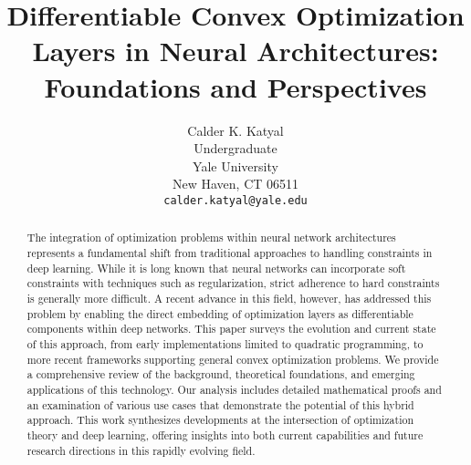 \documentclass{article}
\title{Differentiable Convex Optimization Layers in Neural Architectures: Foundations and Perspectives}
\author{%
  Calder K. Katyal\\
  Undergraduate\\
  Yale University\\
  New Haven, CT 06511 \\
  \texttt{calder.katyal@yale.edu} \\
}
\begin{document}
\maketitle

\begin{abstract}
    The integration of optimization problems within neural network architectures represents a fundamental shift from traditional approaches to handling constraints in deep learning. While it is long known that neural networks can incorporate soft constraints with techniques such as regularization, strict adherence to hard constraints is generally more difficult. A recent advance in this field, however, has addressed this problem by enabling the direct embedding of optimization layers as differentiable components within deep networks. This paper surveys the evolution and current state of this approach, from early implementations limited to quadratic programming, to more recent frameworks supporting general convex optimization problems. We provide a comprehensive review of the background, theoretical foundations, and emerging applications of this technology. Our analysis includes detailed mathematical proofs and an examination of various use cases that demonstrate the potential of this hybrid approach. This work synthesizes developments at the intersection of optimization theory and deep learning, offering insights into both current capabilities and future research directions in this rapidly evolving field. 
\end{abstract}
\end{document}
